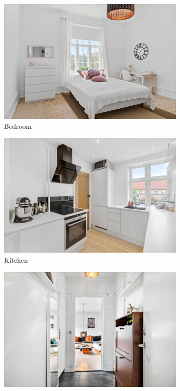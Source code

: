 \begin{figure}[H]
  \begin{subfigure}{0.3\textwidth}
    \includegraphics[width=\linewidth]{pictures/random/example_bedroom}
    \caption{Bedroom}
  \end{subfigure}
  \medskip
  \begin{subfigure}{0.3\textwidth}
    \includegraphics[width=\linewidth]{pictures/random/example_kitchen}
    \caption{Kitchen}
  \end{subfigure}\hfil %
  \begin{subfigure}{0.3\textwidth}
    \includegraphics[width=\linewidth]{pictures/random/example_entre}

\end{subfigure}
\end{figure}

